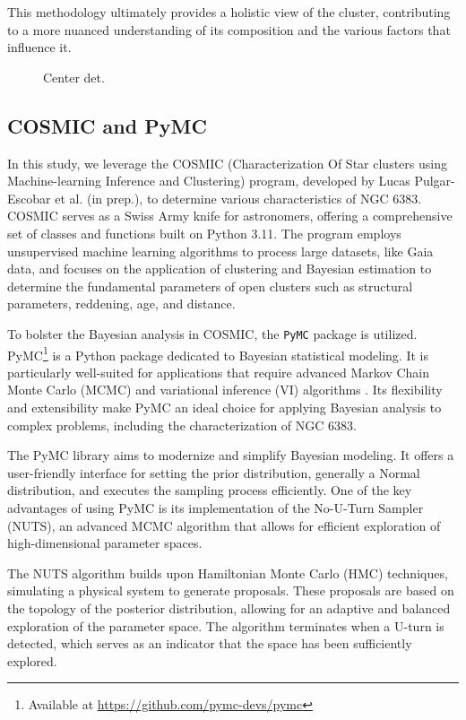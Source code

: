 \documentclass[fleqn,usenatbib,usedcolumn,useAMS]{mnras}
\begin{document}
This methodology ultimately provides a holistic view of the cluster, contributing to a more nuanced understanding of its composition and the various factors that influence it.

\begin{figure}
	\centering
	\caption{Center det.}
	\label{fig:pm}
\end{figure}

\subsection{COSMIC and PyMC}

In this study, we leverage the COSMIC (Characterization Of Star clusters using Machine-learning Inference and Clustering) program, developed by Lucas Pulgar-Escobar et al. (in prep.), to determine various characteristics of NGC 6383. COSMIC serves as a Swiss Army knife for astronomers, offering a comprehensive set of classes and functions built on Python 3.11. The program employs unsupervised machine learning algorithms to process large datasets, like Gaia data, and focuses on the application of clustering and Bayesian estimation to determine the fundamental parameters of open clusters such as structural parameters, reddening, age, and distance.

To bolster the Bayesian analysis in COSMIC, the \texttt{PyMC} package is utilized. PyMC\footnote{Available at \href{https://github.com/pymc-devs/pymc}{https://github.com/pymc-devs/pymc}} is a Python package dedicated to Bayesian statistical modeling. It is particularly well-suited for applications that require advanced Markov Chain Monte Carlo (MCMC) and variational inference (VI) algorithms \citep{Wiecki}. Its flexibility and extensibility make PyMC an ideal choice for applying Bayesian analysis to complex problems, including the characterization of NGC 6383.

The PyMC library aims to modernize and simplify Bayesian modeling. It offers a user-friendly interface for setting the prior distribution, generally a Normal distribution, and executes the sampling process efficiently. One of the key advantages of using PyMC is its implementation of the No-U-Turn Sampler (NUTS), an advanced MCMC algorithm that allows for efficient exploration of high-dimensional parameter spaces.

The NUTS algorithm builds upon Hamiltonian Monte Carlo (HMC) techniques, simulating a physical system to generate proposals. These proposals are based on the topology of the posterior distribution, allowing for an adaptive and balanced exploration of the parameter space. The algorithm terminates when a U-turn is detected, which serves as an indicator that the space has been sufficiently explored.
\end{document}
